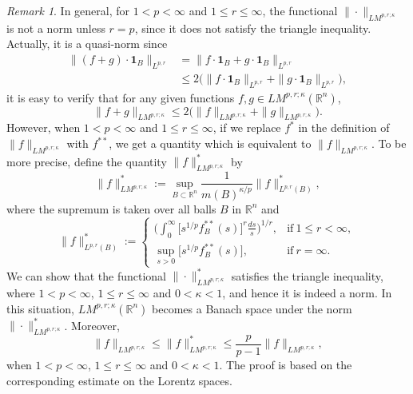 \documentclass{birkjour}
\theoremstyle{definition}
\theoremstyle{remark}
\newtheorem{rem}[thm]{Remark}
\numberwithin{equation}{section}
\begin{document}
\begin{rem}
In general, for $1<p<\infty$ and $1\leq r\leq\infty$, the functional $\|\cdot\|_{LM^{p,r;\kappa}}$ is not a norm unless $r=p$, since it does not satisfy the triangle inequality. Actually, it is a quasi-norm since
\begin{equation*}
\begin{split}
\|(f+g)\cdot \mathbf{1}_{B}\|_{L^{p,r}}&=\|f\cdot \mathbf{1}_{B}+g\cdot \mathbf{1}_{B}\|_{L^{p,r}}\\
&\leq 2\big(\|f\cdot \mathbf{1}_{B}\|_{L^{p,r}}+\|g\cdot \mathbf{1}_{B}\|_{L^{p,r}}\big),
\end{split}
\end{equation*}
it is easy to verify that for any given functions $f,g\in LM^{p,r;\kappa}(\mathbb R^n)$,
\begin{equation*}
\|f+g\|_{LM^{p,r;\kappa}}\leq 2\big(\|f\|_{LM^{p,r;\kappa}}+\|g\|_{LM^{p,r;\kappa}}\big).
\end{equation*}
However, when $1<p<\infty$ and $1\leq r\leq\infty$, if we replace $f^{*}$ in the definition of $\|f\|_{LM^{p,r;\kappa}}$ with $f^{**}$, we get a quantity which is equivalent to $\|f\|_{LM^{p,r;\kappa}}$. To be more precise, define the quantity $\|f\|^{\ast}_{LM^{p,r;\kappa}}$ by
\begin{equation*}
\|f\|^{\ast}_{LM^{p,r;\kappa}}:=\sup_{B\subset\mathbb R^n}\frac{1}{m(B)^{\kappa/p}}\|f\|^{\ast}_{L^{p,r}(B)},
\end{equation*}
where the supremum is taken over all balls $B$ in $\mathbb R^n$ and
\begin{equation*}
\|f\|^{\ast}_{L^{p,r}(B)}:=
\begin{cases}
\displaystyle\bigg(\int_0^{\infty}\Big[s^{1/p}f^{**}_{B}(s)\Big]^r\frac{ds}{s}\bigg)^{1/r}, &\mbox{if}~ 1\leq r<\infty,\\
\displaystyle\sup_{s>0}\Big[s^{1/p}f^{**}_{B}(s)\Big], &\mbox{if}~ r=\infty.
\end{cases}
\end{equation*}
We can show that the functional $\|\cdot\|^{\ast}_{LM^{p,r;\kappa}}$ satisfies the triangle inequality, where $1<p<\infty$, $1\leq r\leq\infty$ and $0<\kappa<1$, and hence it is indeed a norm. In this situation, $LM^{p,r;\kappa}(\mathbb R^n)$ becomes a Banach space under the norm $\|\cdot\|^{\ast}_{LM^{p,r;\kappa}}$. Moreover,
\begin{equation*}
\|f\|_{LM^{p,r;\kappa}}\leq\|f\|^{\ast}_{LM^{p,r;\kappa}}\leq\frac{p}{p-1}\|f\|_{LM^{p,r;\kappa}},
\end{equation*}
when $1<p<\infty$, $1\leq r\leq\infty$ and $0<\kappa<1$. The proof is based on the corresponding estimate on the Lorentz spaces.
\end{rem}
\end{document}
